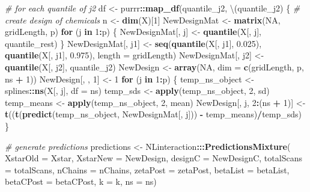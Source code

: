 \documentclass[12pt, twoside]{amherstthesis}
\newenvironment{Shaded}{\begin{snugshade}}{\end{snugshade}}
\newcommand{\AttributeTok}[1]{\textcolor[rgb]{0.13,0.29,0.53}{#1}}
\newcommand{\CommentTok}[1]{\textcolor[rgb]{0.56,0.35,0.01}{\textit{#1}}}
\newcommand{\ConstantTok}[1]{\textcolor[rgb]{0.56,0.35,0.01}{#1}}
\newcommand{\ControlFlowTok}[1]{\textcolor[rgb]{0.13,0.29,0.53}{\textbf{#1}}}
\newcommand{\DecValTok}[1]{\textcolor[rgb]{0.00,0.00,0.81}{#1}}
\newcommand{\FloatTok}[1]{\textcolor[rgb]{0.00,0.00,0.81}{#1}}
\newcommand{\FunctionTok}[1]{\textcolor[rgb]{0.13,0.29,0.53}{\textbf{#1}}}
\newcommand{\NormalTok}[1]{#1}
\newcommand{\OtherTok}[1]{\textcolor[rgb]{0.56,0.35,0.01}{#1}}
\newcommand{\SpecialCharTok}[1]{\textcolor[rgb]{0.81,0.36,0.00}{\textbf{#1}}}
\begin{document}
\begin{Shaded}
\begin{Highlighting}[]
  \CommentTok{\# for each quantile of j2}
\NormalTok{  df }\OtherTok{\textless{}{-}}\NormalTok{ purrr}\SpecialCharTok{::}\FunctionTok{map\_df}\NormalTok{(quantile\_j2, \textbackslash{}(quantile\_j2) \{}
    \CommentTok{\# create design of chemicals}
\NormalTok{    n }\OtherTok{\textless{}{-}} \FunctionTok{dim}\NormalTok{(X)[}\DecValTok{1}\NormalTok{]}
\NormalTok{    NewDesignMat }\OtherTok{\textless{}{-}} \FunctionTok{matrix}\NormalTok{(}\ConstantTok{NA}\NormalTok{, gridLength, p)}
    \ControlFlowTok{for}\NormalTok{ (j }\ControlFlowTok{in} \DecValTok{1}\SpecialCharTok{:}\NormalTok{p) \{}
\NormalTok{      NewDesignMat[, j] }\OtherTok{\textless{}{-}} \FunctionTok{quantile}\NormalTok{(X[, j], quantile\_rest)}
\NormalTok{    \}}
\NormalTok{    NewDesignMat[, j1] }\OtherTok{\textless{}{-}} \FunctionTok{seq}\NormalTok{(}\FunctionTok{quantile}\NormalTok{(X[, j1], }\FloatTok{0.025}\NormalTok{), }
                             \FunctionTok{quantile}\NormalTok{(X[, j1], }\FloatTok{0.975}\NormalTok{), }\AttributeTok{length =}\NormalTok{ gridLength)}
\NormalTok{    NewDesignMat[, j2] }\OtherTok{\textless{}{-}} \FunctionTok{quantile}\NormalTok{(X[, j2], quantile\_j2)}
\NormalTok{    NewDesign }\OtherTok{\textless{}{-}} \FunctionTok{array}\NormalTok{(}\ConstantTok{NA}\NormalTok{, }\AttributeTok{dim =} \FunctionTok{c}\NormalTok{(gridLength, p, ns }\SpecialCharTok{+} \DecValTok{1}\NormalTok{))}
\NormalTok{    NewDesign[, , }\DecValTok{1}\NormalTok{] }\OtherTok{\textless{}{-}} \DecValTok{1}
    \ControlFlowTok{for}\NormalTok{ (j }\ControlFlowTok{in} \DecValTok{1}\SpecialCharTok{:}\NormalTok{p) \{}
\NormalTok{      temp\_ns\_object }\OtherTok{\textless{}{-}}\NormalTok{ splines}\SpecialCharTok{::}\FunctionTok{ns}\NormalTok{(X[, j], }\AttributeTok{df =}\NormalTok{ ns)}
\NormalTok{      temp\_sds }\OtherTok{\textless{}{-}} \FunctionTok{apply}\NormalTok{(temp\_ns\_object, }\DecValTok{2}\NormalTok{, sd)}
\NormalTok{      temp\_means }\OtherTok{\textless{}{-}} \FunctionTok{apply}\NormalTok{(temp\_ns\_object, }\DecValTok{2}\NormalTok{, mean)}
\NormalTok{      NewDesign[, j, }\DecValTok{2}\SpecialCharTok{:}\NormalTok{(ns }\SpecialCharTok{+} \DecValTok{1}\NormalTok{)] }\OtherTok{\textless{}{-}} \FunctionTok{t}\NormalTok{((}\FunctionTok{t}\NormalTok{(}\FunctionTok{predict}\NormalTok{(temp\_ns\_object, }
\NormalTok{                                                NewDesignMat[, j])) }\SpecialCharTok{{-}}\NormalTok{ temp\_means)}\SpecialCharTok{/}\NormalTok{temp\_sds)}
\NormalTok{    \}}
    
    \CommentTok{\# generate predictions}
\NormalTok{    predictions }\OtherTok{\textless{}{-}}\NormalTok{ NLinteraction}\SpecialCharTok{:::}\FunctionTok{PredictionsMixture}\NormalTok{(}
      \AttributeTok{XstarOld =}\NormalTok{ Xstar, }\AttributeTok{XstarNew =}\NormalTok{ NewDesign, }
      \AttributeTok{designC =}\NormalTok{ NewDesignC, }\AttributeTok{totalScans =}\NormalTok{ totalScans, }\AttributeTok{nChains =}\NormalTok{ nChains, }
      \AttributeTok{zetaPost =}\NormalTok{ zetaPost, }\AttributeTok{betaList =}\NormalTok{ betaList, }\AttributeTok{betaCPost =}\NormalTok{ betaCPost, }
      \AttributeTok{k =}\NormalTok{ k, }\AttributeTok{ns =}\NormalTok{ ns)}
    

\end{Highlighting}
\end{Shaded}
\end{document}
